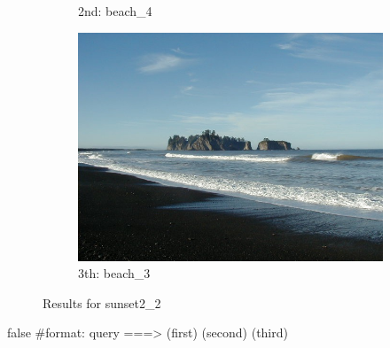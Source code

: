 \begin{itemize}
\begin{figure}[H]
\begin{subfigure}{0.25\textwidth}
        \caption{2nd: beach\_4}
    \end{subfigure}%
    \begin{subfigure}{0.25\textwidth}
	  \centering
	  \includegraphics[width=0.9\linewidth]{../input/beach_3.jpg}
	    \caption{3th: beach\_3}
	\end{subfigure}
    \caption{Results for sunset2\_2}
    \label{fig:results_sunset2_2}
\end{figure}

\end{itemize}


\if false
#format: query ===> (first) (second) (third)

